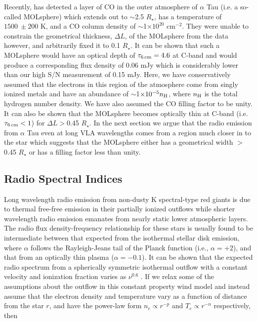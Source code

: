 \documentclass[iop]{emulateapj}
\begin{document}
Recently, \cite{2013A&A...553A...3O} has detected a layer of CO in the outer atmosphere of $\alpha$ Tau (i.e. a so-called MOLsphere) which extends out to $\sim$2.5 $R_{\star}$, has a temperature of $1500 \ \pm 200$ K, and a CO column density of $\sim$1$\times 10^{20}$ cm$^{-2}$. They were unable to constrain the geometrical thickness, $\Delta L$, of the MOLsphere from the data however, and arbitrarily fixed it to 0.1 $R_{\star}$. It can be shown that such a MOLsphere would have an optical depth of $\tau _{\rm{6\,cm}} = 4.6$ at C-band and would produce a corresponding flux density of  0.06 mJy which is considerably lower than our high S/N measurement of 0.15 mJy. Here, we have conservatively assumed that the electrons in this region of the atmosphere come from singly ionized metals and have an abundance of $\sim$1$\times 10^{-5} n_{\rm{H}}$, where $n_{\rm{H}}$ is the total hydrogen number density. We have also assumed the CO filling factor to be unity. It can also be shown that the MOLsphere becomes optically thin at C-band (i.e. $\tau _{\rm{6\,cm}} < 1$) for $\Delta L >$0.45 $R_{\star}$. In the next section we argue that the radio emission from $\alpha$ Tau even at long VLA wavelengths comes from a region much closer in to the star which suggests that the MOLsphere either has a geometrical width  $>$0.45 $R _{\star}$ or has a filling factor less than unity.

\subsection{Radio Spectral Indices} \label{disc:disc3}
Long wavelength radio emission from non-dusty K spectral-type red giants is due to thermal free-free emission in their partially ionized outflows while shorter wavelength radio emission emanates from nearly static lower atmospheric layers. The radio flux density-frequency relationship for these stars is usually found to be intermediate between that expected from the isothermal stellar disk emission, where $\alpha$ follows the Rayleigh-Jeans tail of the Planck function (i.e., $\alpha = +2$), and that from an optically thin plasma ($\alpha = -0.1$). It can be shown that the expected radio spectrum from a spherically symmetric isothermal outflow with a constant velocity and ionization fraction varies as $\nu ^{0.6}$ \citep{1975MNRAS.170...41W,1975AA....39..217O,1975AA....39....1P}. If we relax some of the assumptions about the outflow in this constant property wind model and instead assume that the electron density and temperature vary as a function of distance from the star $r$, and have the power-law form $n_{e} \propto r^{-p}$ and $T_{e} \propto r^{-n}$ respectively, then 
\end{document}

